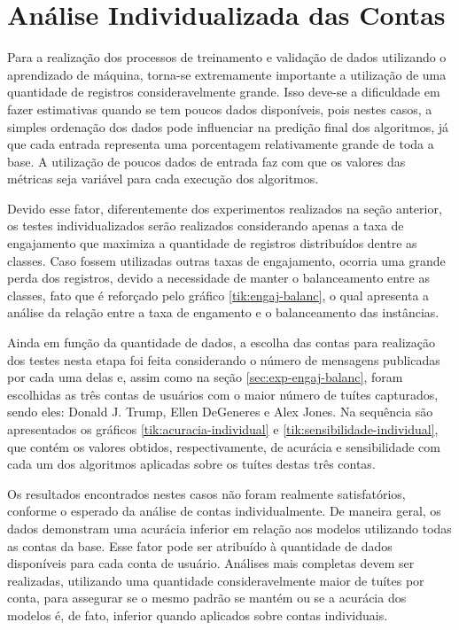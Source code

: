 \documentclass[oneside,openright,12pt]{ufsm_2015} %
\begin{document}

\section{Análise Individualizada das Contas}
\label{sec:exp-analise-individual}

    \par Para a realização dos processos de treinamento e validação de dados utilizando o aprendizado de máquina, torna-se extremamente importante a utilização de uma quantidade de registros consideravelmente grande. Isso deve-se a dificuldade em fazer estimativas quando se tem poucos dados disponíveis, pois nestes casos, a simples ordenação dos dados pode influenciar na predição final dos algoritmos, já que cada entrada representa uma porcentagem relativamente grande de toda a base. A utilização de poucos dados de entrada faz com que os valores das métricas seja variável para cada execução dos algoritmos.

    \par Devido esse fator, diferentemente dos experimentos realizados na seção anterior, os testes individualizados serão realizados considerando apenas a taxa de engajamento que maximiza a quantidade de registros distribuídos dentre as classes. Caso fossem utilizadas outras taxas de engajamento, ocorria uma grande perda dos registros, devido a necessidade de manter o balanceamento entre as classes, fato que é reforçado pelo gráfico \ref{tik:engaj-balanc}, o qual apresenta a análise da relação entre a taxa de engamento e o balanceamento das instâncias. 
    
    \par Ainda em função da quantidade de dados, a escolha das contas para realização dos testes nesta etapa foi feita considerando o número de mensagens publicadas por cada uma delas e, assim como na seção \ref{sec:exp-engaj-balanc}, foram escolhidas as três contas de usuários com o maior número de tuítes capturados, sendo eles: Donald J. Trump, Ellen DeGeneres e Alex Jones. Na sequência são apresentados os gráficos \ref{tik:acuracia-individual} e \ref{tik:sensibilidade-individual}, que contém os valores obtidos, respectivamente, de acurácia e sensibilidade com cada um dos algoritmos aplicadas sobre os tuítes destas três contas.
    
    \par Os resultados encontrados nestes casos não foram realmente satisfatórios, conforme o esperado da análise de contas individualmente. De maneira geral, os dados demonstram uma acurácia inferior em relação aos modelos utilizando todas as contas da base. Esse fator pode ser atribuído à quantidade de dados disponíveis para cada conta de usuário. Análises mais completas devem ser realizadas, utilizando uma quantidade consideravelmente maior de tuítes por conta, para assegurar se o mesmo padrão se mantém ou se a acurácia dos modelos é, de fato, inferior quando aplicados sobre contas individuais.
    
\end{document}
